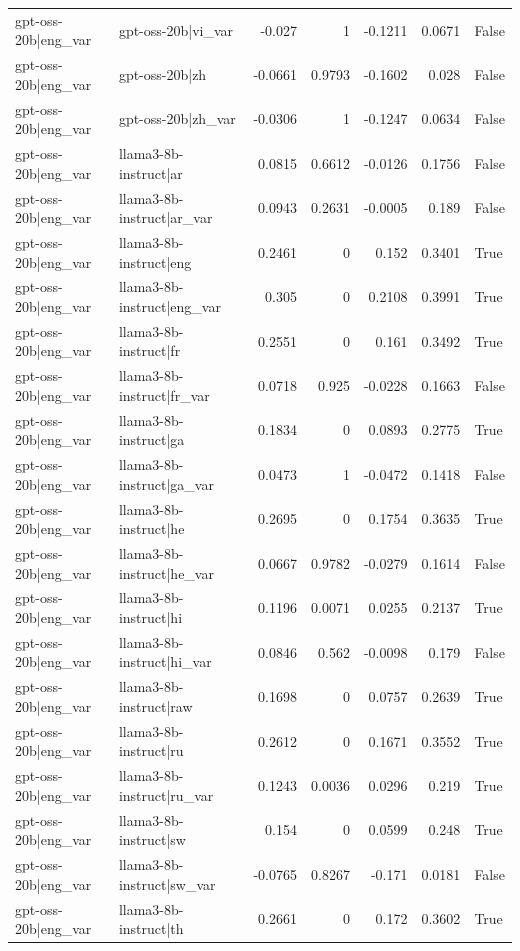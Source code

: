 \begin{table}
\begin{tabular}{l l r r r r l}
gpt-oss-20b|eng_var & gpt-oss-20b|vi_var & -0.027 & 1 & -0.1211 & 0.0671 & False \\
gpt-oss-20b|eng_var & gpt-oss-20b|zh & -0.0661 & 0.9793 & -0.1602 & 0.028 & False \\
gpt-oss-20b|eng_var & gpt-oss-20b|zh_var & -0.0306 & 1 & -0.1247 & 0.0634 & False \\
gpt-oss-20b|eng_var & llama3-8b-instruct|ar & 0.0815 & 0.6612 & -0.0126 & 0.1756 & False \\
gpt-oss-20b|eng_var & llama3-8b-instruct|ar_var & 0.0943 & 0.2631 & -0.0005 & 0.189 & False \\
gpt-oss-20b|eng_var & llama3-8b-instruct|eng & 0.2461 & 0 & 0.152 & 0.3401 & True \\
gpt-oss-20b|eng_var & llama3-8b-instruct|eng_var & 0.305 & 0 & 0.2108 & 0.3991 & True \\
gpt-oss-20b|eng_var & llama3-8b-instruct|fr & 0.2551 & 0 & 0.161 & 0.3492 & True \\
gpt-oss-20b|eng_var & llama3-8b-instruct|fr_var & 0.0718 & 0.925 & -0.0228 & 0.1663 & False \\
gpt-oss-20b|eng_var & llama3-8b-instruct|ga & 0.1834 & 0 & 0.0893 & 0.2775 & True \\
gpt-oss-20b|eng_var & llama3-8b-instruct|ga_var & 0.0473 & 1 & -0.0472 & 0.1418 & False \\
gpt-oss-20b|eng_var & llama3-8b-instruct|he & 0.2695 & 0 & 0.1754 & 0.3635 & True \\
gpt-oss-20b|eng_var & llama3-8b-instruct|he_var & 0.0667 & 0.9782 & -0.0279 & 0.1614 & False \\
gpt-oss-20b|eng_var & llama3-8b-instruct|hi & 0.1196 & 0.0071 & 0.0255 & 0.2137 & True \\
gpt-oss-20b|eng_var & llama3-8b-instruct|hi_var & 0.0846 & 0.562 & -0.0098 & 0.179 & False \\
gpt-oss-20b|eng_var & llama3-8b-instruct|raw & 0.1698 & 0 & 0.0757 & 0.2639 & True \\
gpt-oss-20b|eng_var & llama3-8b-instruct|ru & 0.2612 & 0 & 0.1671 & 0.3552 & True \\
gpt-oss-20b|eng_var & llama3-8b-instruct|ru_var & 0.1243 & 0.0036 & 0.0296 & 0.219 & True \\
gpt-oss-20b|eng_var & llama3-8b-instruct|sw & 0.154 & 0 & 0.0599 & 0.248 & True \\
gpt-oss-20b|eng_var & llama3-8b-instruct|sw_var & -0.0765 & 0.8267 & -0.171 & 0.0181 & False \\
gpt-oss-20b|eng_var & llama3-8b-instruct|th & 0.2661 & 0 & 0.172 & 0.3602 & True \\

\end{tabular}
\end{table}
